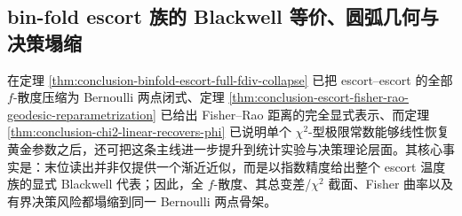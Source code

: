 \subsection{bin-fold escort 族的 Blackwell 等价、圆弧几何与决策塌缩}\label{subsec:conclusion-binfold-escort-blackwell-geometry-risk}
在定理 \ref{thm:conclusion-binfold-escort-full-fdiv-collapse} 已把 escort--escort 的全部 \(f\)-散度压缩为 Bernoulli 两点闭式、定理 \ref{thm:conclusion-escort-fisher-rao-geodesic-reparametrization} 已给出 Fisher--Rao 距离的完全显式表示、而定理 \ref{thm:conclusion-chi2-linear-recovers-phi} 已说明单个 \(\chi^2\)-型极限常数能够线性恢复黄金参数之后，还可把这条主线进一步提升到统计实验与决策理论层面。其核心事实是：末位读出并非仅提供一个渐近近似，而是以指数精度给出整个 escort 温度族的显式 Blackwell 代表；因此，全 \(f\)-散度、其总变差/\(\chi^2\) 截面、Fisher 曲率以及有界决策风险都塌缩到同一 Bernoulli 两点骨架。

